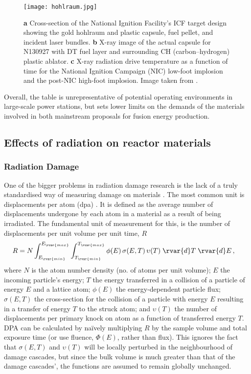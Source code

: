 \begin{figure}
    \centering
    \texttt{[image: hohlraum.jpg]}
    \caption[Hohlraum design for indirect drive in Inertial Confinement Fusion.]{\textbf{a} Cross-section of the National Ignition Facility's ICF target design showing the gold hohlraum and plastic capsule, fuel pellet, and incident laser bundles. \textbf{b} X-ray image of the actual capsule for N130927 with DT fuel layer and surrounding CH (carbon–hydrogen) plastic ablator. \textbf{c} X-ray radiation drive temperature as a function of time for the National Ignition Campaign (NIC) low-foot implosion and the post-NIC high-foot implosion. Image taken from \cite{hohlraum}.}
    \label{f:hohlraum}
\end{figure}

Overall, the table is unrepresentative of potential operating environments in large-scale power stations, but sets lower limits on the demands of the materials involved in both mainstream proposals for fusion energy production.

\subsection{Effects of radiation on reactor materials}
\label{ss:rad_effect_mat}

\subsubsection{Radiation Damage}
\label{sss:rad_damage}

One of the bigger problems in radiation damage research is the lack of a truly standardised way of measuring damage on materials \cite{srimisbad}. The most common unit is displacements per atom (dpa) \cite{dpa}. It is defined as the average number of displacements undergone by each atom in a material as a result of being irradiated. The fundamental unit of measurement for this, is the number of displacements per unit volume per unit time, $R$
\begin{align}\label{eq:dpa}
    R & = N\int _{E_{\rvar{min}}}^{E_{\rvar{max}}}\int _{T_{\rvar{min}}}^{T_{\rvar{max}}}\phi (E)\,\sigma (E,T)\,\upsilon (T)\;\rvar{d}T\;\rvar{d}E\,,
\end{align}
where $ N $ is the atom number density (no. of atoms per unit volume); $ E $ the incoming particle's energy; $ T $ the energy transferred in a collision of a particle of energy $E$ and a lattice atom; $ \phi(E) $ the energy-dependent particle flux; $ \sigma(E,T) $ the cross-section for the collision of a particle with energy $ E $ resulting in a transfer of energy $ T $ to the struck atom; and $ \upsilon(T) $ the number of displacements per primary knock on atom as a function of transferred energy $ T $. DPA can be calculated by na\"{i}vely multiplying $ R $ by the sample volume and total exposure time (or use fluence, $\Phi(E)$, rather than flux). This ignores the fact that $\sigma (E,T)$ and $\upsilon (T)$ will be locally perturbed in the neighbourhood of damage cascades, but since the bulk volume is much greater than that of the damage cascades', the functions are assumed to remain globally unchanged.


